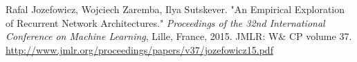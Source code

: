 \documentclass[10pt]{amsart}
\begin{document}
\begin{thebibliography}{9}
Rafal Jozefowicz, Wojciech Zaremba, Ilya Sutskever.  "An Empirical Exploration of Recurrent Network Architectures."  \emph{Proceedings of the 32nd International  Conference on  Machine Learning}, Lille, France, 2015.  JMLR: W\& CP volume 37.  \url{http://www.jmlr.org/proceedings/papers/v37/jozefowicz15.pdf} 
  
\end{thebibliography}
\end{document}
